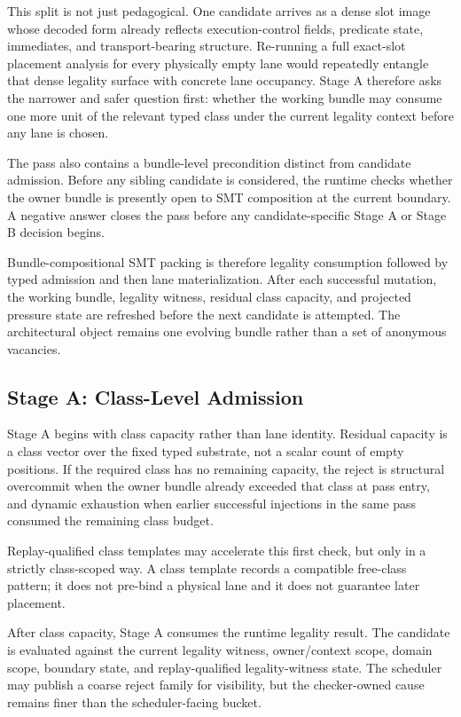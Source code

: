 \documentclass[twocolumn]{article}
\begin{document}
This split is not just pedagogical. One candidate arrives as a dense slot image whose decoded form already reflects execution-control fields, predicate state, immediates, and transport-bearing structure. Re-running a full exact-slot placement analysis for every physically empty lane would repeatedly entangle that dense legality surface with concrete lane occupancy. Stage A therefore asks the narrower and safer question first: whether the working bundle may consume one more unit of the relevant typed class under the current legality context before any lane is chosen.

The pass also contains a bundle-level precondition distinct from candidate admission. Before any sibling candidate is considered, the runtime checks whether the owner bundle is presently open to SMT composition at the current boundary. A negative answer closes the pass before any candidate-specific Stage A or Stage B decision begins.

Bundle-compositional SMT packing is therefore legality consumption followed by typed admission and then lane materialization. After each successful mutation, the working bundle, legality witness, residual class capacity, and projected pressure state are refreshed before the next candidate is attempted. The architectural object remains one evolving bundle rather than a set of anonymous vacancies.


\subsection{Stage A: Class-Level Admission}

Stage A begins with class capacity rather than lane identity. Residual capacity is a class vector over the fixed typed substrate, not a scalar count of empty positions. If the required class has no remaining capacity, the reject is structural overcommit when the owner bundle already exceeded that class at pass entry, and dynamic exhaustion when earlier successful injections in the same pass consumed the remaining class budget.

Replay-qualified class templates may accelerate this first check, but only in a strictly class-scoped way. A class template records a compatible free-class pattern; it does not pre-bind a physical lane and it does not guarantee later placement.

After class capacity, Stage A consumes the runtime legality result. The candidate is evaluated against the current legality witness, owner/context scope, domain scope, boundary state, and replay-qualified legality-witness state. The scheduler may publish a coarse reject family for visibility, but the checker-owned cause remains finer than the scheduler-facing bucket.
\end{document}
